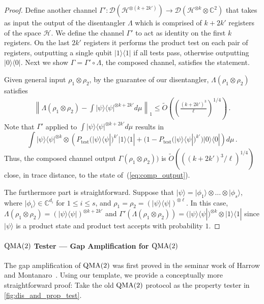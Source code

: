 \documentclass[10pt,a4paper]{article}
\theoremstyle{remark}
\def\to{\rightarrow}
\def\cal{\mathcal}
\newcommand{\mper}{\,.}
\newcommand{\C}{{\mathbb C}}
\newcommand{\norm}[1]{\ensuremath{\left\lVert #1 \right\rVert}}
\newcommand{\calD}{{\cal D}}
\newcommand{\calH}{{\cal H}}
\newcommand{\1}[1]{\mathds{1}{[#1]}}
\newcommand{\ket}[1]{\lvert #1\rangle}
\newcommand{\QMA}{\textup{QMA}}
\newcommand{\bra}[1]{\langle#1|}
\numberwithin{equation}{section}
\begin{document}
\begin{proof}
  Define another channel $\Gamma' \colon \calD(\calH^{\otimes( k+2k')}) \to \calD(\calH^{\otimes k} \otimes \C^2)$ that takes as input
  the output of the disentangler $\Lambda$ which is comprised of $k+2k'$ registers of the space $\calH$. 
  We define the channel $\Gamma'$ to act as identity on the first $k$ registers. On the last $2k'$ registers it performs the product test
  on each pair of registers, outputting a single qubit $\ket{1}\bra{1}$ if all tests pass, otherwise outputting $\ket{0}\bra{0}$.
  Next we show $\Gamma = \Gamma' \circ \Lambda$, the composed channel, satisfies the statement.

  Given general input $\rho_1 \otimes \rho_2$, by the guarantee of our disentangler, $\Lambda(\rho_1 \otimes \rho_2)$ satisfies
  \begin{align*}
    \norm{\Lambda(\rho_1 \otimes \rho_2) - \int \ket{\psi}\bra{\psi}^{\otimes k+2k'} d\mu}_1 \le \tilde O\left(\left(\frac{(k+2k')^3}{\ell}\right)^{1/4}\right)\mper
  \end{align*}
  Note that $\Gamma'$ applied to $\int \ket{\psi}\bra{\psi}^{\otimes k+2k'} d\mu$ results in
  \begin{equation}\label{eq:comp_output}
    \int \ket{\psi}\bra{\psi}^{\otimes k} \otimes \left( P_{\text{test}}(\ket{\psi}\bra{\psi})^{k'}  \ket{1}\bra{1} +  (1-P_{\text{test}}(\ket{\psi}\bra{\psi})^{k'}) \ket{0}\bra{0} \right) d\mu \mper
  \end{equation}
  Thus, the composed channel output $\Gamma(\rho_1 \otimes \rho_2))$ is $\tilde O(((k+2k')^3/\ell)^{1/4})$ close, in trace distance, to the state of~(\ref{eq:comp_output}).

  
  The furthermore part is straightforward. Suppose that $\ket{\psi} = \ket{\phi_1}\otimes \ldots \otimes \ket{\phi_s}$, where $\ket{\phi_i} \in \C^{d_i}$ for $1 \le i \le s$,
  and $\rho_1 = \rho_2 = (\ket{\psi}\bra{\psi})^{\otimes \ell}$. In this case, $\Lambda(\rho_1 \otimes \rho_2) = (\ket{\psi}\bra{\psi})^{\otimes k+2k'}$
  and $\Gamma'(\Lambda(\rho_1 \otimes \rho_2)) = (\ket{\psi}\bra{\psi})^{\otimes k} \otimes \ket{1}\bra{1}$ since $\ket{\psi}$ is a product state
  and product test accepts with probability $1$.
\end{proof}

\paragraph{$\QMA(2)$ Tester --- Gap Amplification for $\QMA(2)$}
The gap amplification of $\QMA(2)$ was first proved in the seminar work of Harrow and Montanaro~\cite{HM13}. Using our template, we provide a conceptually more straightforward proof: Take the old $\QMA(2)$ protocol as the property tester in \cref{fig:dis_and_prop_test}.
\end{document}
